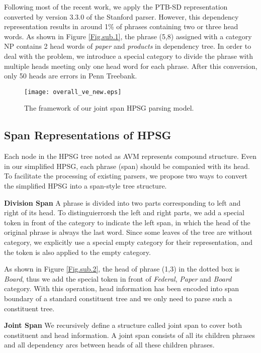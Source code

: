 \documentclass[11pt,a4paper]{article}
\begin{document}
Following most of the recent work, we apply the PTB-SD representation converted by version 3.3.0 of the Stanford parser.
However, this dependency representation results in around 1\% of phrases containing two or three head words. 
As shown in Figure \ref{Fig.sub.1}, the phrase (5,8) assigned with a category NP contains 2 head words of \textit{paper} and \textit{products} in dependency tree.
In order to deal with the problem, we introduce a special category  to divide the phrase with multiple heads meeting only one head word for each phrase. After this conversion, only 50 heads are errors in Penn Treebank.

\label{Tree Preprocessing}
\begin{figure*}[t!]
    \centering
    \texttt{[image: overall\_ve\_new.eps]}
    
    \caption{The framework of our joint span HPSG parsing model.}
    \label{fig3}
\end{figure*}
\subsection{Span Representations of HPSG}

Each node in the HPSG tree noted as AVM represents compound structure. Even in our simplified HPSG, each phrase (span) should be companied with its head.
To facilitate the processing of existing parsers, we propose two ways to convert the simplified HPSG into a span-style tree structure.

\noindent \textbf{Division Span} A phrase is divided into two parts corresponding to left and right of its head. 
To distinguierrorsh the left and right parts, we add a special token  in front of the category to indicate the left span, in which the head of the original phrase is always the last word.
Since some leaves of the tree are without category, we explicitly use a special empty category  for their representation, and the token  is also applied to the empty category.

As shown in Figure \ref{Fig.sub.2}, the head of phrase (1,3) in the dotted box is \textit{Board}, thus we add the special token  in front of \textit{Federal},  \textit{Paper} and \textit{Board} category.
With this operation, head information has been encoded into span boundary of a standard constituent tree and we only need to parse such a constituent tree.

\noindent \textbf{Joint Span}
We recursively define a structure called joint span to cover both constituent and head information.
A joint span consists of all its children phrases and all dependency arcs between heads of all these children phrases. 
\end{document}
